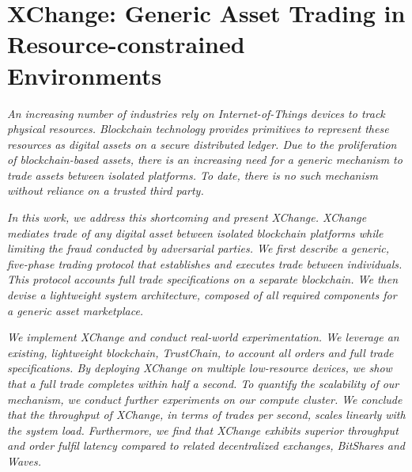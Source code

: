 \chapter{XChange: Generic Asset Trading in Resource-constrained Environments}
\label{chapter:xchange}

\emph{An increasing number of industries rely on Internet-of-Things devices to track physical resources.
	Blockchain technology provides primitives to represent these resources as digital assets on a secure distributed ledger.
	Due to the proliferation of blockchain-based assets, there is an increasing need for a generic mechanism to trade assets between isolated platforms.
	To date, there is no such mechanism without reliance on a trusted third party. }
	
\emph{In this work, we address this shortcoming and present XChange.
	XChange mediates trade of \emph{any} digital asset between isolated blockchain platforms while limiting the fraud conducted by adversarial parties.
	We first describe a generic, five-phase trading protocol that establishes and executes trade between individuals.
	This protocol accounts full trade specifications on a separate blockchain.
	We then devise a lightweight system architecture, composed of all required components for a generic asset marketplace.}
	
\emph{We implement XChange and conduct real-world experimentation.
	We leverage an existing, lightweight blockchain, TrustChain, to account all orders and full trade specifications.
	By deploying XChange on multiple low-resource devices, we show that a full trade completes within half a second.
	To quantify the scalability of our mechanism, we conduct further experiments on our compute cluster.
	We conclude that the throughput of XChange, in terms of trades per second, scales linearly with the system load.
	Furthermore, we find that XChange exhibits superior throughput and order fulfil latency compared to related decentralized exchanges, BitShares and Waves. }

\newpage

